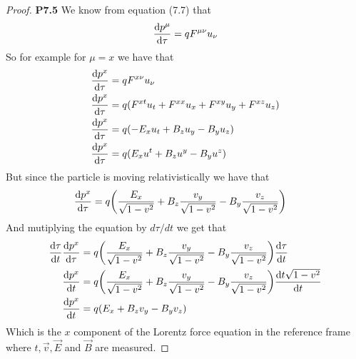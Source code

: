 \documentclass[11pt]{article}
\theoremstyle{definition}
\begin{document}
\cleardoublepage
\begin{proof}{\textbf{P7.5}}
    We know from equation (7.7) that
    \begin{align*}
        \derivative{p^\mu}{\tau} = qF^{\mu\nu}u_\nu
    \end{align*}
    So for example for $\mu = x$ we have that
    \begin{align*}
        \derivative{p^x}{\tau} &= qF^{x\nu}u_\nu\\
        \derivative{p^x}{\tau} &=
        q(F^{xt}u_t + F^{xx}u_x + F^{xy}u_y + F^{xz}u_z)\\
        \derivative{p^x}{\tau} &= q(-E_xu_t + B_zu_y - B_yu_z)\\
        \derivative{p^x}{\tau} &= q(E_xu^t + B_zu^y - B_yu^z)
    \end{align*}
    But since the particle is moving relativistically we have that
    \begin{align*}
        \derivative{p^x}{\tau} &=
        q\bigg(\frac{E_x}{\sqrt{1 - v^2}} + B_z\frac{v_y}{\sqrt{1 - v^2}}
        - B_y\frac{v_z}{\sqrt{1 - v^2}}\bigg)
    \end{align*}
    And mutiplying the equation by $d\tau/dt$ we get that
    \begin{align*}
        \derivative{\tau}{t}\derivative{p^x}{\tau} &=
        q\bigg(\frac{E_x}{\sqrt{1 - v^2}} + B_z\frac{v_y}{\sqrt{1 - v^2}}
        - B_y\frac{v_z}{\sqrt{1 - v^2}}\bigg)\derivative{\tau}{t}\\
        \derivative{p^x}{t} &=
        q\bigg(\frac{E_x}{\sqrt{1 - v^2}} + B_z\frac{v_y}{\sqrt{1 - v^2}}
        - B_y\frac{v_z}{\sqrt{1 - v^2}}\bigg)\derivative{t\sqrt{1 - v^2}}{t}\\
        \derivative{p^x}{t} &= q(E_x + B_z v_y - B_y v_z)
    \end{align*}
    Which is the $x$ component of the Lorentz force equation in the reference
    frame where $t, \vec{v}, \vec{E}$ and $\vec{B}$ are measured.


\end{proof}
\end{document}
